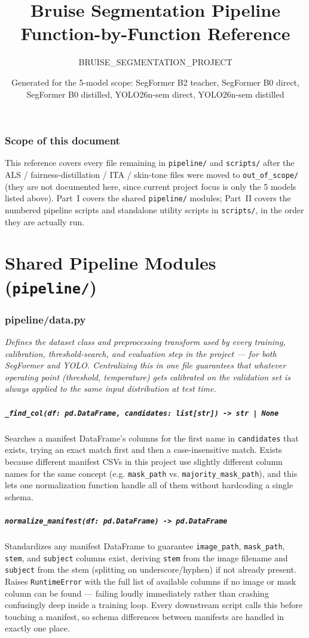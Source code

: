 \documentclass[11pt]{article}
\title{Bruise Segmentation Pipeline\\\large Function-by-Function Reference}
\author{BRUISE\_SEGMENTATION\_PROJECT}
\date{Generated for the 5-model scope: SegFormer B2 teacher, SegFormer B0 direct,\\
SegFormer B0 distilled, YOLO26n-sem direct, YOLO26n-sem distilled}
\newcommand{\role}[1]{\par\noindent\textit{#1}\par\vspace{0.5em}}
\newcommand{\func}[1]{\subsubsection*{\texttt{#1}}}
\begin{document}
\maketitle

\section*{Scope of this document}
This reference covers every file remaining in \texttt{pipeline/} and \texttt{scripts/}
after the ALS / fairness-distillation / ITA / skin-tone files were moved to
\texttt{out\_of\_scope/} (they are not documented here, since current project focus
is only the 5 models listed above). Part~I covers the shared \texttt{pipeline/}
modules; Part~II covers the numbered pipeline scripts and standalone utility scripts
in \texttt{scripts/}, in the order they are actually run.

\tableofcontents
\newpage

\part{Shared Pipeline Modules (\texttt{pipeline/})}

\section{pipeline/data.py}
\role{Defines the dataset class and preprocessing transform used by every
training, calibration, threshold-search, and evaluation step in the project ---
for both SegFormer and YOLO. Centralizing this in one file guarantees that
whatever operating point (threshold, temperature) gets calibrated on the
validation set is always applied to the same input distribution at test time.}

\func{\_find\_col(df: pd.DataFrame, candidates: list[str]) -> str | None}
Searches a manifest DataFrame's columns for the first name in \texttt{candidates}
that exists, trying an exact match first and then a case-insensitive match.
Exists because different manifest CSVs in this project use slightly different
column names for the same concept (e.g. \texttt{mask\_path} vs.
\texttt{majority\_mask\_path}), and this lets one normalization function handle
all of them without hardcoding a single schema.

\func{normalize\_manifest(df: pd.DataFrame) -> pd.DataFrame}
Standardizes any manifest DataFrame to guarantee \texttt{image\_path},
\texttt{mask\_path}, \texttt{stem}, and \texttt{subject} columns exist, deriving
\texttt{stem} from the image filename and \texttt{subject} from the stem (splitting
on underscore/hyphen) if not already present. Raises \texttt{RuntimeError} with the
full list of available columns if no image or mask column can be found ---
failing loudly immediately rather than crashing confusingly deep inside a
training loop. Every downstream script calls this before touching a manifest,
so schema differences between manifests are handled in exactly one place.
\end{document}
